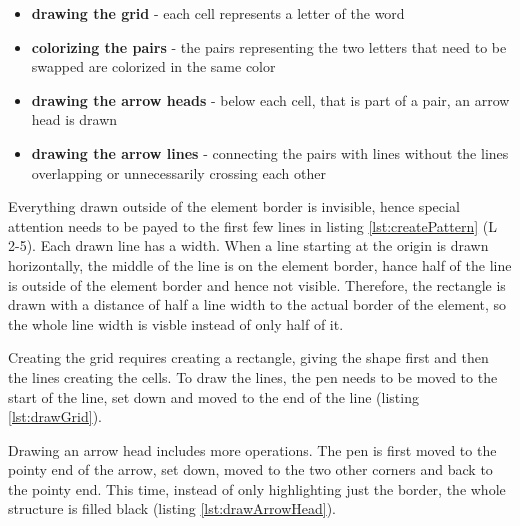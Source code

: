 \begin{itemize}
  \item \textbf{drawing the grid} - each cell represents a letter of the word
  \item \textbf{colorizing the pairs} - the pairs representing the two letters that need to be swapped are colorized in the same color
  \item \textbf{drawing the arrow heads} - below each cell, that is part of a pair, an arrow head is drawn
  \item \textbf{drawing the arrow lines} - connecting the pairs with lines without the lines overlapping or unnecessarily crossing each other
\end{itemize}

Everything drawn outside of the  element border is invisible, hence special attention needs to be payed to the first few lines in listing \ref{lst:createPattern} (L 2-5). Each drawn line has a width. When a line starting at the origin is drawn horizontally, the middle of the line is on the  element border, hance half of the line is outside of the  element border and hence not visible. Therefore, the rectangle is drawn with a distance of half a line width to the actual border of the  element, so the whole line width is visble instead of only half of it. 

Creating the grid requires creating a rectangle, giving the shape first and then the lines creating the cells. To draw the lines, the pen needs to be moved to the start of the line, set down and moved to the end of the line (listing \ref{lst:drawGrid}). 

Drawing an arrow head includes more operations. The pen is first moved to the pointy end of the arrow, set down, moved to the two other corners and back to the pointy end. This time, instead of only highlighting just the border, the whole structure is filled black (listing \ref{lst:drawArrowHead}).

